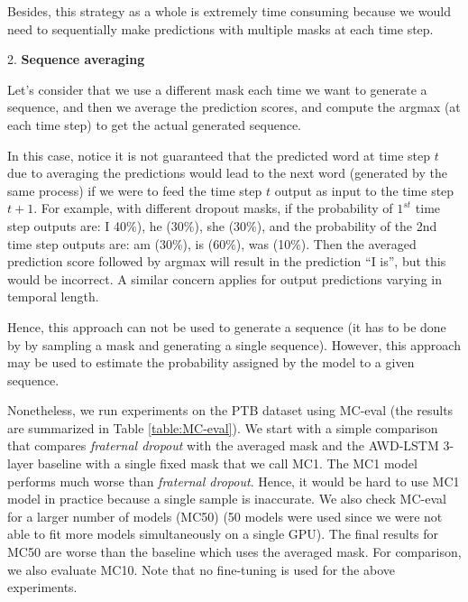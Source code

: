 \documentclass{article} \usepackage{iclr2018_conference,times}
\begin{document}
Besides, this strategy as a whole is extremely time consuming because we would need to sequentially make predictions with multiple masks at each time step.

2. \textbf{Sequence averaging}

Let's consider that we use a different mask each time we want to generate a sequence, and then we average the prediction scores, and compute the argmax (at each time step) to get the actual generated sequence.

In this case, notice it is not guaranteed that the predicted word at time step $t$ due to averaging the predictions would lead to the next word (generated by the same process) if we were to feed the time step $t$ output as input to the time step $t+1$. For example, with different dropout masks, if the probability of $1^{st}$ time step outputs are: I 40\%), he (30\%), she (30\%), and the probability of the 2nd time step outputs are: am (30\%), is (60\%), was (10\%). Then the averaged prediction score followed by argmax will result in the prediction ``I is'', but this would be incorrect. A similar concern applies for output predictions varying in temporal length.

Hence, this approach can not be used to generate a sequence (it has to be done by by sampling a mask and generating a single sequence). However, this approach may be used to estimate the probability assigned by the model to a given sequence.

Nonetheless, we run experiments on the PTB dataset using MC-eval (the results are summarized in Table \ref{table:MC-eval}). We start with a simple comparison that compares \emph{fraternal dropout} with the averaged mask and the AWD-LSTM 3-layer baseline with a single fixed mask that we call MC1. The MC1 model performs much worse than \emph{fraternal dropout}. Hence, it would be hard to use MC1 model in practice because a single sample is inaccurate. We also check MC-eval for a larger number of models (MC50) (50 models were used since we were not able to fit more models simultaneously on a single GPU). The final results for MC50 are worse than the baseline which uses the averaged mask. For comparison, we also evaluate MC10. Note that no fine-tuning is used for the above experiments.
\end{document}

